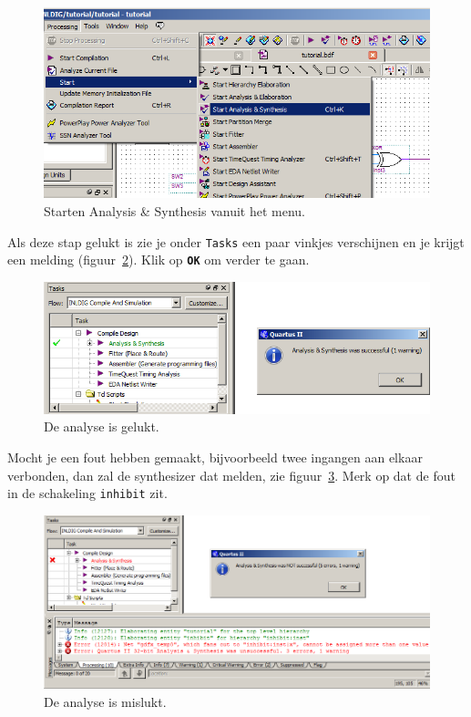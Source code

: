 \documentclass[a4paper,12pt,fleqn,twoside]{book}
\def\tutpicscale{0.455}
\newcommand{\knop}[1]{\texttt{\textbf{#1}}}
\newcommand{\naam}[1]{\texttt{#1}}
\begin{document}
\begin{figure}[H]
\centering
\includegraphics[scale=\tutpicscale]{039startanalysis}
\caption{Starten Analysis \& Synthesis vanuit het menu.}
\label{fig:039startanalysis}
\end{figure}

Als deze stap gelukt is zie je onder \naam{Tasks} een paar vinkjes verschijnen
en je krijgt een melding (figuur~\ref{fig:040analysissynthesissuccessful}).
Klik op \knop{OK} om verder te gaan.
 
\begin{figure}[H]
\centering
\includegraphics[scale=\tutpicscale]{040analysissynthesissuccessful}
\caption{De analyse is gelukt.}
\label{fig:040analysissynthesissuccessful}
\end{figure}

Mocht je een fout hebben gemaakt, bijvoorbeeld twee ingangen aan elkaar
verbonden, dan zal de synthesizer dat melden, zie
figuur~\ref{fig:041notsuccesful}.
Merk op dat de fout in de schakeling \naam{inhibit} zit.

\begin{figure}[H]
\centering
\includegraphics[scale=\tutpicscale]{041notsuccesful}
\caption{De analyse is mislukt.}
\label{fig:041notsuccesful}
\end{figure}
\end{document}
